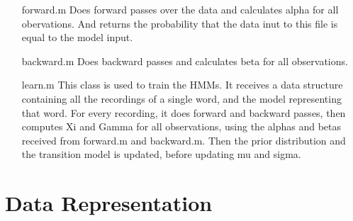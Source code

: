 \documentclass[titlepage]{article}
\begin{document}
\begin{itemize}
\item[forward.m] Does forward passes over the data and calculates alpha for all obervations. And returns the probability that the data inut to this file is equal to the model input. 

\item[backward.m] Does backward passes and calculates beta for all observations.

\item[learn.m] This class is used to train the HMMs. It receives a data structure containing all the recordings of a single word, and the model representing that word. For every recording, it does forward and backward passes, then computes Xi and Gamma for all observations, using the alphas and betas received from forward.m and backward.m. Then the prior distribution and the transition model is updated, before updating mu and sigma.

\end{itemize}

\newpage
\section{Data Representation}
\end{document}
